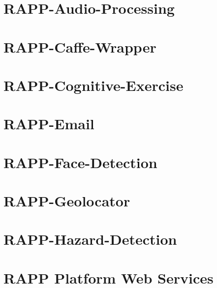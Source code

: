 \documentclass[twoside]{book}
\begin{document}
\chapter{R\-A\-P\-P-\/\-Audio-\/\-Processing}
\label{md_rapp-platform_8wiki_RAPP-Audio-Processing}
\hypertarget{md_rapp-platform_8wiki_RAPP-Audio-Processing}{}

\chapter{R\-A\-P\-P-\/\-Caffe-\/\-Wrapper}
\label{md_rapp-platform_8wiki_RAPP-Caffe-Wrapper}
\hypertarget{md_rapp-platform_8wiki_RAPP-Caffe-Wrapper}{}

\chapter{R\-A\-P\-P-\/\-Cognitive-\/\-Exercise}
\label{md_rapp-platform_8wiki_RAPP-Cognitive-Exercise}
\hypertarget{md_rapp-platform_8wiki_RAPP-Cognitive-Exercise}{}

\chapter{R\-A\-P\-P-\/\-Email}
\label{md_rapp-platform_8wiki_RAPP-Email}
\hypertarget{md_rapp-platform_8wiki_RAPP-Email}{}

\chapter{R\-A\-P\-P-\/\-Face-\/\-Detection}
\label{md_rapp-platform_8wiki_RAPP-Face-Detection}
\hypertarget{md_rapp-platform_8wiki_RAPP-Face-Detection}{}

\chapter{R\-A\-P\-P-\/\-Geolocator}
\label{md_rapp-platform_8wiki_RAPP-Geolocator}
\hypertarget{md_rapp-platform_8wiki_RAPP-Geolocator}{}

\chapter{R\-A\-P\-P-\/\-Hazard-\/\-Detection}
\label{md_rapp-platform_8wiki_RAPP-Hazard-Detection}
\hypertarget{md_rapp-platform_8wiki_RAPP-Hazard-Detection}{}

\chapter{R\-A\-P\-P Platform Web Services}
\label{md_rapp-platform_8wiki_RAPP-HOP-Web-services}
\hypertarget{md_rapp-platform_8wiki_RAPP-HOP-Web-services}{}

\end{document}
